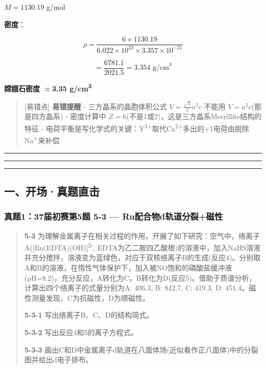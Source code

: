 \documentclass[a4paper,11pt]{ctexart}
\newcommand{\箭}{\ensuremath{\rightarrow}}
\newcommand{\左箭}{\ensuremath{\leftarrow}}
\newcommand{\上箭}{\ensuremath{\uparrow}}
\newcommand{\下箭}{\ensuremath{\downarrow}}
\newcommand{\衡}{\ensuremath{\rightleftharpoons}}
\newcommand{\双箭}{\ensuremath{\leftrightarrow}}
\newcommand{\约等于}{\ensuremath{\approx}}
\newcommand{\小于等于}{\ensuremath{\leq}}
\newcommand{\大于等于}{\ensuremath{\geq}}
\newcommand{\不等于}{\ensuremath{\neq}}
\newcommand{\西格马}{\ensuremath{\sigma}}
\newcommand{\派}{\ensuremath{\pi}}
\begin{document}
\(M = 1130.19\) g/mol

\textbf{密度}：

\[\rho = \frac{6 \times 1130.19}{6.022 \times 10^{23} \times 3.357 \times 10^{-21}}\]

\[= \frac{6781.1}{2021.5} = 3.354 \text{ g/cm}^3\]

\textbf{嫦娥石密度 \约等于 3.35 g/cm\textsuperscript{3}}

\begin{quote}
{[}易错点{]} \textbf{易错提醒}
- 三方晶系的晶胞体积公式 \(V = \frac{\sqrt{3}}{2}a^2c\) 不能用 \(V = a^2c\)(那是四方晶系)
- 密度计算中 \(Z = 6\)(不是1或2)，这是三方晶系Merrillite结构的特征
- 电荷平衡是写化学式的关键：Y\textsuperscript{3+}取代Ca\textsuperscript{2+}多出的+1电荷由脱除Na\textsuperscript{+}来补偿
\end{quote}

\begin{center}\rule{0.5\linewidth}{0.5pt}\end{center}

\begin{center}\rule{0.5\linewidth}{0.5pt}\end{center}

\begin{center}\rule{0.5\linewidth}{0.5pt}\end{center}

\subsection{一、开场·真题直击}\label{ux4e00ux5f00ux573aux771fux9898ux76f4ux51fb-4}

\subsubsection{真题1：37届初赛第5题 5-3 --- Ru配合物d轨道分裂+磁性}\label{ux771fux9898137ux5c4aux521dux8d5bux7b2c5ux9898-5-3-ruux914dux5408ux7269dux8f68ux9053ux5206ux88c2ux78c1ux6027}

\begin{quote}
\textbf{5-3} 为理解金属离子在相关过程的作用，开展了如下研究：空气中，络离子A({[}Ru(EDTA)(OH){]}\textsuperscript{2-}, EDTA为乙二胺四乙酸根)的溶液中，加入NaHS溶液并充分搅拌，溶液变为蓝绿色，对应于双核络离子B的生成(反应4)。分别取A和B的溶液，在惰性气体保护下，加入被NO饱和的磷酸盐缓冲液(pH=8.2)，充分反应，A转化为C，B转化为D(反应5)。借助于质谱分析，计算出四个络离子的式量分别为A: 406.3, B: 842.7, C: 419.3, D: 451.4。磁性测量发现，C为抗磁性，D为顺磁性。

\textbf{5-3-1} 写出络离子B、C、D的结构简式。

\textbf{5-3-2} 写出反应4和5的离子方程式。

\textbf{5-3-3} 画出C和D中金属离子d轨道在八面体场(近似看作正八面体)中的分裂图并给出d电子排布。
\end{quote}
\end{document}
